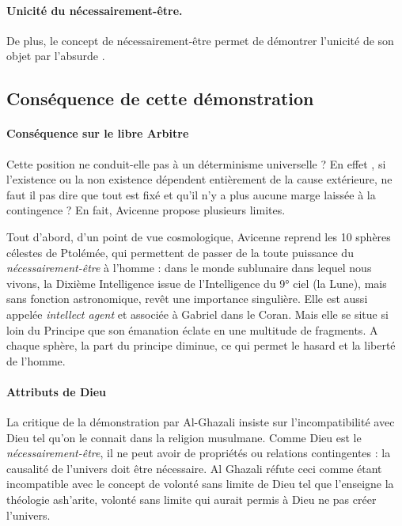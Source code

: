  
\paragraph{Unicité du nécessairement-être.} De plus, le concept de nécessairement-être permet de démontrer l’unicité de son objet par l'absurde . 

\subsection{Conséquence de cette démonstration}


\paragraph{Conséquence sur le libre Arbitre}

   Cette position ne conduit-elle pas à un déterminisme universelle ? En effet ,
si l'existence ou la non existence dépendent entièrement de la cause extérieure, ne faut il pas dire que tout est fixé et qu'il n'y a plus aucune marge laissée à la contingence ? En fait, Avicenne propose plusieurs limites.

Tout d'abord, d'un point de vue cosmologique, Avicenne reprend les 10 sphères célestes de Ptolémée, qui permettent de passer de la toute puissance du \textit{nécessairement-être} à l'homme : dans le monde sublunaire dans lequel nous vivons, la Dixième Intelligence  issue de l'Intelligence du 9° ciel (la Lune), mais sans fonction astronomique, revêt une importance singulière. Elle est aussi appelée \textit{intellect agent} et associée à Gabriel dans le Coran. Mais elle se situe si loin du Principe que son émanation éclate en une multitude de fragments. A chaque sphère, la part du principe diminue, ce qui permet le hasard et la liberté de l'homme.

\paragraph{Attributs de Dieu}
La critique de la démonstration par Al-Ghazali insiste sur l’incompatibilité avec Dieu tel qu'on le connait dans la religion musulmane. Comme Dieu est le \textit{nécessairement-être}, il ne peut avoir de propriétés ou relations contingentes : la causalité de l'univers doit être nécessaire. Al Ghazali réfute ceci comme étant incompatible avec le concept de volonté sans limite de Dieu tel que l'enseigne la théologie ash'arite, volonté sans limite qui aurait permis à Dieu ne pas créer l’univers.


